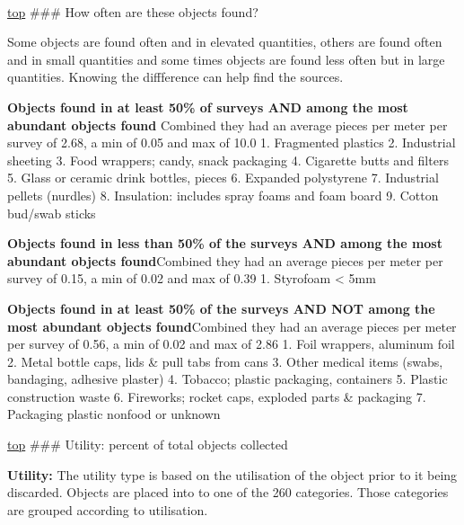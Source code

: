 \documentclass[11pt]{article}
\begin{document}
    \begin{center}
    \end{center}
    { \hspace*{\fill} \\}
    
    \hyperref[top]{top} \#\#\# How often are these objects found?

    Some objects are found often and in elevated quantities, others are
found often and in small quantities and some times objects are found
less often but in large quantities. Knowing the diffference can help
find the sources.
 
            
    
    \textbf{Objects found in at least 50\% of surveys AND among the most
abundant objects found} Combined they had an average pieces per meter
per survey of 2.68, a min of 0.05 and max of 10.0 1. Fragmented plastics
2. Industrial sheeting 3. Food wrappers; candy, snack packaging 4.
Cigarette butts and filters 5. Glass or ceramic drink bottles, pieces 6.
Expanded polystyrene 7. Industrial pellets (nurdles) 8. Insulation:
includes spray foams and foam board 9. Cotton bud/swab sticks

    
 
            
    
    \textbf{Objects found in less than 50\% of the surveys AND among the
most abundant objects found}Combined they had an average pieces per
meter per survey of 0.15, a min of 0.02 and max of 0.39 1. Styrofoam
\textless{} 5mm

    
 
            
    
    \textbf{Objects found in at least 50\% of the surveys AND NOT among the
most abundant objects found}Combined they had an average pieces per
meter per survey of 0.56, a min of 0.02 and max of 2.86 1. Foil
wrappers, aluminum foil 2. Metal bottle caps, lids \& pull tabs from
cans 3. Other medical items (swabs, bandaging, adhesive plaster) 4.
Tobacco; plastic packaging, containers 5. Plastic construction waste 6.
Fireworks; rocket caps, exploded parts \& packaging 7. Packaging plastic
nonfood or unknown

    

    \hyperref[top]{top} \#\#\# Utility: percent of total objects collected

\textbf{Utility:} The utility type is based on the utilisation of the
object prior to it being discarded. Objects are placed into to one of
the 260 categories. Those categories are grouped according to
utilisation.
\end{document}
